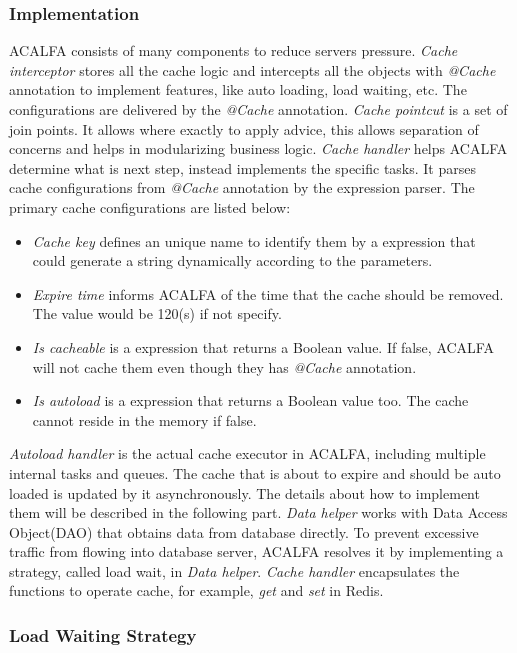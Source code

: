 \documentclass{singlecol-new}
\theoremstyle{TH}{
\newtheorem{lemma}{Lemma}
\newtheorem{theorem}[lemma]{Theorem}
\newtheorem{corrolary}[lemma]{Corrolary}
\newtheorem{conjecture}[lemma]{Conjecture}
\newtheorem{proposition}[lemma]{Proposition}
\newtheorem{claim}[lemma]{Claim}
\newtheorem{stheorem}[lemma]{Wrong Theorem}
}
\theoremstyle{THrm}{
\newtheorem{definition}{Definition}[section]
\newtheorem{question}{Question}[section]
\newtheorem{remark}{Remark}
\newtheorem{scheme}{Scheme}
}
\theoremstyle{THhit}{
\newtheorem{case}{Case}[section]
}
\begin{document}
\subsubsection{Implementation}

ACALFA consists of many components to reduce servers pressure. \textit{Cache interceptor} stores all the cache logic and intercepts all the objects with \textit{@Cache} annotation to implement features, like auto loading, load waiting, etc. The configurations are delivered by the \textit{@Cache} annotation. \textit{Cache pointcut} is a set of join points. It allows where exactly to apply advice, this allows separation of concerns and helps in modularizing business logic. \textit{Cache handler} helps ACALFA determine what is next step, instead implements the specific tasks. It parses cache configurations from \textit{@Cache} annotation by the expression parser. The primary cache configurations are listed below:

\begin{itemize}
    \item \textit{Cache key} defines an unique name to identify them by a expression that could generate a string dynamically according to the parameters.
    \item \textit{Expire time} informs ACALFA of the time that the cache should be removed. The value would be 120(s) if not specify.
    \item \textit{Is cacheable} is a expression that returns a Boolean value. If false, ACALFA will not cache them even though they has \textit{@Cache} annotation.
    \item \textit{Is autoload} is a expression that returns a Boolean value too. The cache cannot reside in the memory if false.
\end{itemize}

\textit{Autoload handler} is the actual cache executor in ACALFA, including multiple internal tasks and queues. The cache that is about to expire and should be auto loaded is updated by it asynchronously. The details about how to implement them will be described in the following part. \textit{Data helper} works with Data Access Object(DAO) that obtains data from database directly. To prevent excessive traffic from flowing into database server, ACALFA resolves it by implementing a strategy, called load wait, in \textit{Data helper}. \textit{Cache handler} encapsulates the functions to operate cache, for example, \textit{get} and \textit{set} in Redis.


\subsubsection{Load Waiting Strategy}
\end{document}
